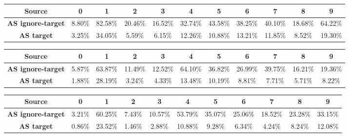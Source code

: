 \documentclass{report}
\begin{document}
\begin{center}
{\tiny
  \begin{tabular}{|c|c|c|c|c|c|c|c|c|c|c|}
  \hline
  \textbf{Source} & \textbf{0} & \textbf{1} & \textbf{2} & \textbf{3} & \textbf{4} & \textbf{5} & \textbf{6} & \textbf{7} & \textbf{8} & \textbf{9}  \\ \hline
  \textbf{AS ignore-target} & 8.80\% & 82.58\% & 20.46\% & 16.52\% & 32.74\% & 43.58\% & 38.25\% & 40.10\% & 18.68\% & 64.22\% \\ \hline
  \textbf{AS target} & 3.25\% & 34.05\% & 5.59\% & 6.15\% & 12.26\% & 10.88\% & 13.21\% & 11.85\% & 8.52\% & 19.30\% \\ \hline
  \end{tabular}
}
\end{center}

\begin{center}
{\tiny
  \begin{tabular}{|c|c|c|c|c|c|c|c|c|c|c|}
  \hline
  \textbf{Source} & \textbf{0} & \textbf{1} & \textbf{2} & \textbf{3} & \textbf{4} & \textbf{5} & \textbf{6} & \textbf{7} & \textbf{8} & \textbf{9}  \\ \hline
  \textbf{AS ignore-target} & 5.87\% & 63.87\% & 11.49\% & 12.52\% & 64.10\% & 36.82\% & 26.99\% & 39.75\% & 16.21\% & 19.36\% \\ \hline
  \textbf{AS target} & 1.88\% & 28.19\% & 3.24\% & 4.33\% & 13.48\% & 10.19\% & 8.81\% & 7.71\% & 5.71\% & 8.22\% \\ \hline
  \end{tabular}
}
\end{center}

\begin{center}
{\tiny
  \begin{tabular}{|c|c|c|c|c|c|c|c|c|c|c|}
  \hline
  \textbf{Source} & \textbf{0} & \textbf{1} & \textbf{2} & \textbf{3} & \textbf{4} & \textbf{5} & \textbf{6} & \textbf{7} & \textbf{8} & \textbf{9}  \\ \hline
  \textbf{AS ignore-target} & 3.21\% & 60.25\% & 7.43\% & 10.57\% & 53.79\% & 35.07\% & 25.06\% & 18.52\% & 23.28\% & 33.15\% \\ \hline
  \textbf{AS target} & 0.86\% & 23.52\% & 1.46\% & 2.88\% & 10.88\% & 9.28\% & 6.34\% & 4.24\% & 8.24\% & 12.08\% \\ \hline
  \end{tabular}
}
\end{center}
\end{document}
